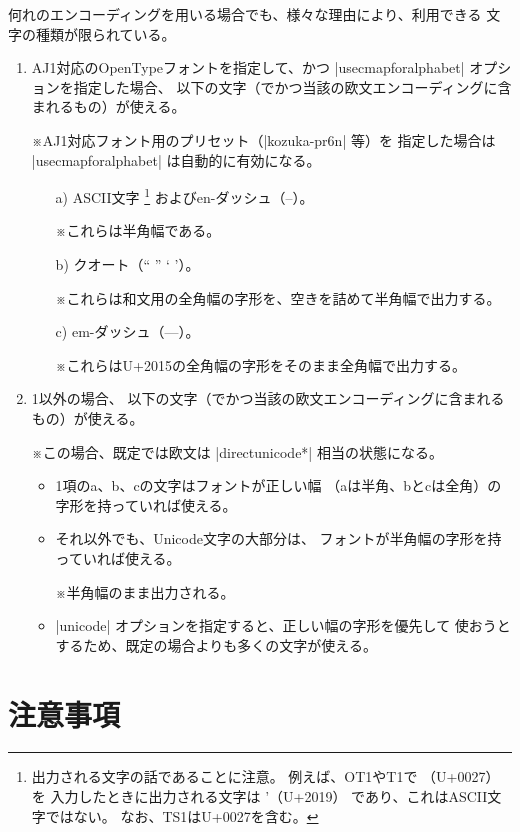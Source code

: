 \documentclass[uplatex,dvipdfmx,a4paper]{jsarticle}
\newcommand{\Note}{\par\noindent ※}
\providecommand{\Strong}[1]{\textsf{#1}}
\begin{document}
何れのエンコーディングを用いる場合でも、様々な理由により、利用できる
文字の種類が限られている。
\begin{enumerate}
\item AJ1対応のOpenTypeフォントを指定して、かつ |usecmapforalphabet|
  オプションを指定した場合、
  以下の文字（でかつ当該の欧文エンコーディングに含まれるもの）が使える。
  \Note AJ1対応フォント用のプリセット（|kozuka-pr6n| 等）を
  指定した場合は |usecmapforalphabet| は自動的に有効になる。
  \begin{itemize}
  \item[a)] ASCII文字
    \footnote{出力される文字の話であることに注意。
      例えば、OT1やT1で \textsf{\textquotesingle}（U+0027）を
      入力したときに出力される文字は \textsf{\textquoteright}（U+2019）
      であり、これはASCII文字ではない。
      なお、TS1はU+0027を含む。}%
    およびen-ダッシュ（\textsf{--}）。
    \Note これらは半角幅である。
  \item[b)] クオート（\textsf{`` '' ` '}）。
    \Note これらは和文用の全角幅の字形を、空きを詰めて半角幅で出力する。
  \item[c)] em-ダッシュ（\textsf{---}）。
    \Note これらはU+2015の全角幅の字形をそのまま全角幅で出力する。
  \end{itemize}
\item 1以外の場合、
  以下の文字（でかつ当該の欧文エンコーディングに含まれるもの）が使える。
  \Note この場合、既定では欧文は |directunicode*| 相当の状態になる。
  \begin{itemize}
  \item 1項のa、b、cの文字はフォントが正しい幅
    （aは\Strong{半角}、bとcは\Strong{全角}）の字形を持っていれば使える。
  \item それ以外でも、Unicode文字の大部分は、
    フォントが\Strong{半角幅}の字形を持っていれば使える。
    \Note 半角幅のまま出力される。
  \item |unicode| オプションを指定すると、正しい幅の字形を優先して
    使おうとするため、既定の場合よりも多くの文字が使える。
  \end{itemize}
\end{enumerate}


\section{注意事項}
\label{sec:Notice}
\end{document}
